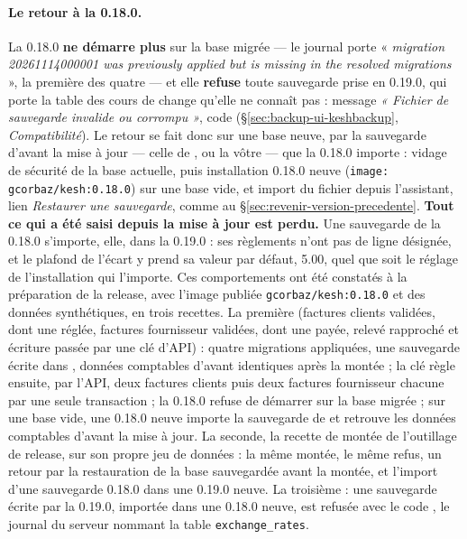 \documentclass[a4paper,11pt,oneside]{article}
\begin{document}
\paragraph{Le retour à la 0.18.0.} La 0.18.0 \textbf{ne démarre plus} sur la base migrée --- le journal porte « \emph{migration 20261114000001 was previously applied but is missing in the resolved migrations} », la première des quatre --- et elle \textbf{refuse} toute sauvegarde prise en 0.19.0, qui porte la table des cours de change qu'elle ne connaît pas : message \emph{« Fichier de sauvegarde invalide ou corrompu »}, code  (\S\ref{sec:backup-ui-keshbackup}, \emph{Compatibilité}). Le retour se fait donc sur une base neuve, par la sauvegarde d'avant la mise à jour --- celle de , ou la vôtre --- que la 0.18.0 importe : vidage de sécurité de la base actuelle, puis installation 0.18.0 neuve (\texttt{image: gcorbaz/kesh:0.18.0}) sur une base vide, et import du fichier depuis l'assistant, lien \emph{Restaurer une sauvegarde}, comme au \S\ref{sec:revenir-version-precedente}. \textbf{Tout ce qui a été saisi depuis la mise à jour est perdu.} Une sauvegarde de la 0.18.0 s'importe, elle, dans la 0.19.0 : ses règlements n'ont pas de ligne désignée, et le plafond de l'écart y prend sa valeur par défaut, 5.00, quel que soit le réglage de l'installation qui l'importe. Ces comportements ont été constatés à la préparation de la release, avec l'image publiée \texttt{gcorbaz/kesh:0.18.0} et des données synthétiques, en trois recettes. La première (factures clients validées, dont une réglée, factures fournisseur validées, dont une payée, relevé rapproché et écriture passée par une clé d'API) : quatre migrations appliquées, une sauvegarde écrite dans , données comptables d'avant identiques après la montée ; la clé règle ensuite, par l'API, deux factures clients puis deux factures fournisseur chacune par une seule transaction ; la 0.18.0 refuse de démarrer sur la base migrée ; sur une base vide, une 0.18.0 neuve importe la sauvegarde de  et retrouve les données comptables d'avant la mise à jour. La seconde, la recette de montée de l'outillage de release, sur son propre jeu de données : la même montée, le même refus, un retour par la restauration de la base sauvegardée avant la montée, et l'import d'une sauvegarde 0.18.0 dans une 0.19.0 neuve. La troisième : une sauvegarde écrite par la 0.19.0, importée dans une 0.18.0 neuve, est refusée avec le code , le journal du serveur nommant la table \texttt{exchange\_rates}.
\end{document}
